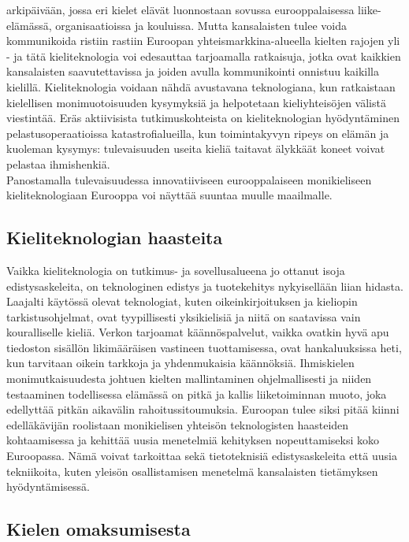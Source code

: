 \begin{multicols}{2}
arkipäivään, jossa eri kielet elävät luonnostaan sovussa eurooppalaisessa
liike-elämässä, organisaatioissa ja kouluissa. Mutta kansalaisten tulee voida
kommunikoida ristiin rastiin Euroopan yhteismarkkina-alueella kielten rajojen
yli - ja tätä kieliteknologia voi edesauttaa tarjoamalla ratkaisuja, jotka ovat
kaikkien kansalaisten saavutettavissa ja joiden avulla kommunikointi
onnistuu kaikilla kielillä. Kieliteknologia voidaan nähdä avustavana
teknologiana, kun ratkaistaan kielellisen monimuotoisuuden kysymyksiä ja
helpotetaan kieliyhteisöjen välistä viestintää. Eräs aktiivisista tutkimuskohteista 
on kieliteknologian hyödyntäminen pelastusoperaatioissa katastrofialueilla, 
kun toimintakyvyn ripeys on elämän ja kuoleman kysymys: tulevaisuuden useita 
kieliä taitavat älykkäät koneet voivat pelastaa ihmishenkiä.\\
Panostamalla tulevaisuudessa innovatiiviseen eurooppalaiseen monikieliseen
kieliteknologiaan Eurooppa voi näyttää suuntaa muulle maailmalle.



\subsection{Kieliteknologian haasteita}


Vaikka kieliteknologia on tutkimus- ja sovellusalueena jo ottanut isoja
edistysaskeleita, on teknologinen edistys ja tuotekehitys nykyisellään liian
hidasta. Laajalti käytössä olevat teknologiat, kuten oikeinkirjoituksen ja
kieliopin tarkistusohjelmat, ovat tyypillisesti yksikielisiä ja niitä on
saatavissa vain kouralliselle kieliä. Verkon tarjoamat käännöspalvelut, vaikka
ovatkin hyvä apu tiedoston sisällön likimääräisen vastineen tuottamisessa,
ovat hankaluuksissa heti, kun tarvitaan oikein tarkkoja ja yhdenmukaisia
käännöksiä. Ihmiskielen monimutkaisuudesta johtuen kielten mallintaminen
ohjelmallisesti ja niiden testaaminen todellisessa elämässä on pitkä ja kallis
liiketoiminnan muoto, joka edellyttää pitkän aikavälin rahoitussitoumuksia.
Euroopan tulee siksi pitää kiinni edelläkävijän roolistaan monikielisen
yhteisön teknologisten haasteiden kohtaamisessa ja kehittää uusia menetelmiä
kehityksen nopeuttamiseksi koko Euroopassa. Nämä voivat tarkoittaa sekä
tietoteknisiä edistysaskeleita että uusia tekniikoita, kuten yleisön
osallistamisen menetelmä kansalaisten tietämyksen hyödyntämisessä.



\subsection{Kielen omaksumisesta}



\end{multicols}
